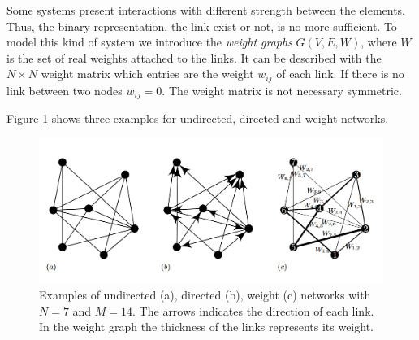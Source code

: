 Some systems present interactions with different strength between the elements. Thus, the binary representation, the link exist or not, is no more sufficient. To model this kind of system we introduce the \textit{weight graphs} $G(V,E,W)$, where $W$ is the set of real weights attached to the links.   
It can be described with the $N\times N$ weight matrix which entries are the weight $w_{ij}$ of each link. If there is no link between two nodes $w_{ij} = 0$. The weight matrix is not necessary symmetric. 

Figure \ref{fig:weight_graphs} shows three examples for undirected, directed and weight networks.
\begin{figure}[ht!]
    \centering
    \includegraphics[scale=0.5]{image/weight_graphs.png}
    \caption{Examples of undirected (a), directed (b), weight (c) networks with $N=7$ and $M=14$. The arrows indicates the direction of each link. In the weight graph the thickness of the links represents its weight.}
    \label{fig:weight_graphs}
\end{figure}





